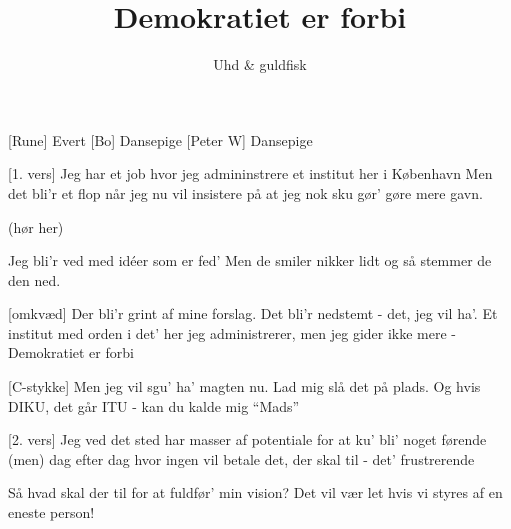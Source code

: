 \documentclass[a4paper,11pt]{article}
\title{Demokratiet er forbi}
\author{Uhd \& guldfisk}
\begin{document}
\maketitle

\begin{roles}
  [Rune] Evert
  [Bo] Dansepige
  [Peter W] Dansepige
\end{roles}

\begin{props}
\prop{}
\end{props}

  
\begin{song}

[1. vers] Jeg har et job
hvor jeg admininstrere
et institut her i København
Men det bli'r et flop
når jeg nu vil insistere
på at jeg nok sku gør' gøre mere gavn.  

(hør her)

Jeg bli'r ved med id\'eer som er fed'
Men de
smiler
nikker lidt
og så stemmer de den ned.


[omkvæd]
Der bli'r grint af mine forslag.
Det bli'r nedstemt - det, jeg vil ha'.
Et institut med orden i
det' her jeg administrerer,
men jeg gider ikke mere
- Demokratiet er forbi

[C-stykke]
Men jeg vil sgu' ha' magten nu.
Lad mig slå det på plads.
Og hvis DIKU, det går ITU
- kan du kalde mig ``Mads''

[2. vers] Jeg ved det sted
har masser af potentiale 
for at ku' bli'
noget førende
(men) dag efter dag
hvor ingen vil betale
det, der skal til
- det' frustrerende

Så hvad skal der til
for at fuldfør' min vision?
Det vil 
vær let
hvis vi styres af en eneste person!




\end{song}
\end{document}

